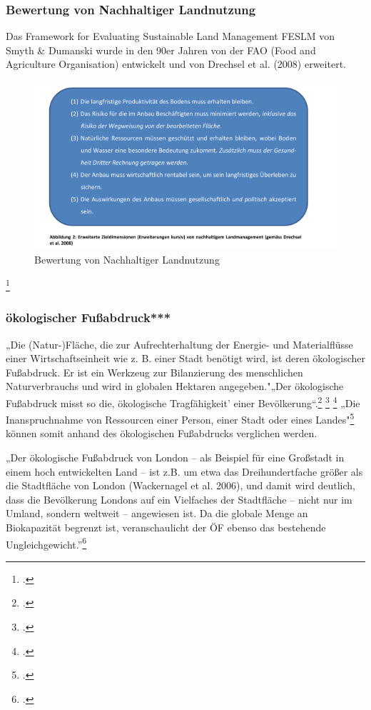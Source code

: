 \documentclass{scrartcl}
\begin{document}
\subsubsection{Bewertung von Nachhaltiger Landnutzung}
Das Framework for Evaluating Sustainable Land Management FESLM von Smyth \& Dumanski wurde in den 90er Jahren von der FAO (Food and Agriculture Organisation) entwickelt und von Drechsel et al. (2008) erweitert.
\begin{figure}[htbp]
\centering
\includegraphics[width=12cm]{image_folder/drechsel.png}
\caption{Bewertung von Nachhaltiger Landnutzung}
\label{fig:Bewertung von Nachhaltiger Landnutzung}
\end{figure}\footcite{TobiasSpringDerBasel-Stadt, S.17}

\subsubsection{ökologischer Fußabdruck***}
„Die (Natur-)Fläche, die zur Aufrechterhaltung der Energie- und Materialflüsse einer Wirtschaftseinheit wie z. B. einer Stadt benötigt wird, ist deren ökologischer Fußabdruck. Er ist ein Werkzeug zur Bilanzierung des menschlichen Naturverbrauchs und wird in globalen Hektaren angegeben."„Der ökologische Fußabdruck misst so die‚ ökologische Tragfähigkeit’ einer Bevölkerung“.\footcite[S. 25]{MathisWackernagelUnserNimmt} \footcite[S.5]{MichelsenGrundlagenEntwicklung} 
\footcite[Vgl.][S.23ff]{MathisWackernagelUnserNimmt}
„Die Inanspruchnahme von Ressourcen einer Person, einer Stadt oder eines Landes"\footcite[S.192]{AntjeFlade2015StadtStadtforschung} können somit anhand des ökologischen Fußabdrucks verglichen werden. 

\begin{displayquote}
„Der ökologische Fußabdruck von London – als Beispiel für eine Großstadt in einem hoch entwickelten Land – ist z.B. um etwa das Dreihundertfache größer als die Stadtfläche von London (Wackernagel et al. 2006), und damit wird deutlich, dass die Bevölkerung Londons auf ein Vielfaches der Stadtfläche – nicht nur im Umland, sondern weltweit – angewiesen ist. Da die globale Menge an Biokapazität begrenzt ist, veranschaulicht der ÖF ebenso das bestehende Ungleichgewicht.”\footcite{AntjeFlade2015StadtStadtforschung, S.192}
\end{displayquote} 
\end{document}
